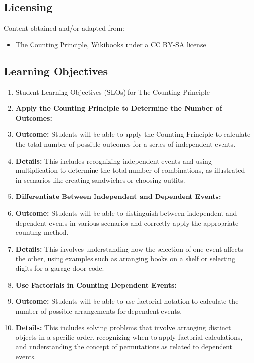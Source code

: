 \subsection{Licensing}
\label{sss:lice-7352}




Content obtained and/or adapted from:



\begin{itemize}
    \item \href{https://en.wikibooks.org/wiki/Probability/The_Counting_Principle}{The Counting Principle, Wikibooks} under a CC BY-SA license
\end{itemize}


\subsection{Learning Objectives}
\label{ssec:lear-fe6e}


\begin{enumerate}
    \item Student Learning Objectives (SLOs) for The Counting Principle
    \item \textbf{Apply the Counting Principle to Determine the Number of Outcomes:}
    \item \textbf{Outcome:} Students will be able to apply the Counting Principle to calculate the total number of possible outcomes for a series of independent events.
    \item \textbf{Details:} This includes recognizing independent events and using multiplication to determine the total number of combinations, as illustrated in scenarios like creating sandwiches or choosing outfits.
    \item \textbf{Differentiate Between Independent and Dependent Events:}
    \item \textbf{Outcome:} Students will be able to distinguish between independent and dependent events in various scenarios and correctly apply the appropriate counting method.
    \item \textbf{Details:} This involves understanding how the selection of one event affects the other, using examples such as arranging books on a shelf or selecting digits for a garage door code.
    \item \textbf{Use Factorials in Counting Dependent Events:}
    \item \textbf{Outcome:} Students will be able to use factorial notation to calculate the number of possible arrangements for dependent events.
    \item \textbf{Details:} This includes solving problems that involve arranging distinct objects in a specific order, recognizing when to apply factorial calculations, and understanding the concept of permutations as related to dependent events.
\end{enumerate}


